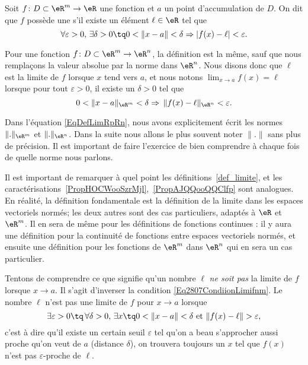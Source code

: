 \begin{definition}\label{def_limite}
	Soit $f\colon D\subset\eR^m\to \eR$ une fonction et $a$ un point d'accumulation de $D$.  On dit que $f$ possède une  s'il existe un élément $\ell\in\eR$ tel que
	\begin{equation}		\label{Eq2807CondiionLimifnm}
		\forall\varepsilon>0,\,\exists\delta>0\tq 0<\| x-a \|<\delta\Rightarrow | f(x)-\ell |<\varepsilon.
	\end{equation}

	Pour une fonction $f\colon D\subset\eR^m\to \eR^n$, la définition est la même, sauf que nous remplaçons la valeur absolue par la norme dans $\eR^n$. Nous disons donc que $\ell$ est la limite de $f$ lorsque $x$ tend vers $a$, et nous notons $\lim_{x\to a} f(x)=\ell$ lorsque pour tout $\varepsilon>0$, il existe un $\delta>0$ tel que
	\begin{equation}		\label{EqDefLimRpRn}
		0<\| x-a \|_{\eR^m}<\delta\Rightarrow\,\| f(x)-\ell \|_{\eR^n}<\varepsilon.
	\end{equation}
\end{definition}

\begin{remark}
	Dans l'équation \eqref{EqDefLimRpRn}, nous avons explicitement écrit les normes $\| . \|_{\eR^m}$ et $\| . \|_{\eR^n}$. Dans la suite nous allons le plus souvent noter $\| . \|$ sans plus de précision. Il est important de faire l'exercice de bien comprendre à chaque fois de quelle norme nous parlons.
\end{remark}

\begin{remark}
	Il est important de remarquer à quel point les définitions~\ref{def_limite}, et les caractérisations~\ref{PropHOCWooSzrMjl},~\ref{PropAJQQooQQClfp} sont analogues. En réalité, la définition fondamentale est la définition de la limite dans les espaces vectoriels normés; les deux autres sont des cas particuliers, adaptés à $\eR$ et $\eR^m$. Il en sera de même pour les définitions de fonctions continues : il y aura une définition pour la continuité de fonctions entre espaces vectoriels normés, et ensuite une définition pour les fonctions de $\eR^m$ dans $\eR^n$ qui en sera un cas particulier.
\end{remark}

Tentons de comprendre ce que signifie qu'un nombre $\ell$ \emph{ne soit pas} la limite de $f$ lorsque $x\to a$. Il s'agit d'inverser la condition \eqref{Eq2807CondiionLimifnm}. Le nombre $\ell$ n'est pas une limite de $f$ pour $x\to a$ lorsque
\begin{equation}		\label{EqCaractNonLim}
	\exists\varepsilon>0\tq\,\forall\delta>0,\,\exists x\tq 0<\| x-a \|<\delta\text{ et }\| f(x)-\ell \|>\varepsilon,
\end{equation}
c'est à dire qu'il existe un certain seuil $\varepsilon$ tel qu'on a beau s'approcher aussi proche qu'on veut de $a$ (distance $\delta$), on trouvera toujours un $x$ tel que $f(x)$ n'est pas $\varepsilon$-proche de $\ell$.

